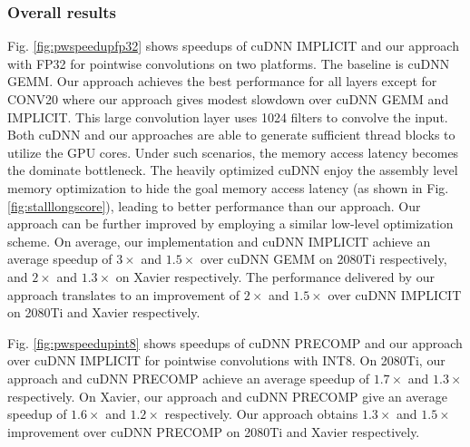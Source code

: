 \subsubsection{Overall results}
  Fig. \ref{fig:pwspeedupfp32} shows speedups of cuDNN IMPLICIT and our approach with FP32  for pointwise
convolutions on two platforms. The baseline is cuDNN GEMM. Our approach achieves the best performance for all layers except for CONV20
where our approach gives modest slowdown over cuDNN GEMM and IMPLICIT. This large convolution layer uses 1024 filters to convolve the
input. Both cuDNN and our approaches are able to generate sufficient thread blocks to utilize the GPU cores. Under such scenarios, the
memory access latency becomes the dominate bottleneck. The heavily optimized cuDNN enjoy the assembly level memory optimization to hide the
goal memory access latency (as shown in Fig. \ref{fig:stalllongscore}), leading to better performance than our approach. Our approach can
be further improved by employing a similar low-level optimization scheme. On average, our implementation and cuDNN IMPLICIT achieve an
average speedup of $3\times$ and $1.5\times$ over cuDNN GEMM on 2080Ti respectively, and $2\times$ and $1.3\times$ on Xavier respectively.
The performance delivered by our approach translates to an improvement of $2\times$ and $1.5\times$ over cuDNN IMPLICIT on 2080Ti and
Xavier respectively.

  Fig. \ref{fig:pwspeedupint8} shows speedups of cuDNN PRECOMP and our approach over cuDNN IMPLICIT for
pointwise convolutions with INT8. On 2080Ti, our approach and cuDNN PRECOMP achieve an average speedup of $1.7\times$ and $1.3\times$
respectively. On Xavier, our approach and cuDNN PRECOMP give an average speedup of $1.6\times$ and $1.2\times$ respectively. Our approach
obtains $1.3\times$ and $1.5\times$ improvement over cuDNN PRECOMP on 2080Ti and Xavier respectively.


